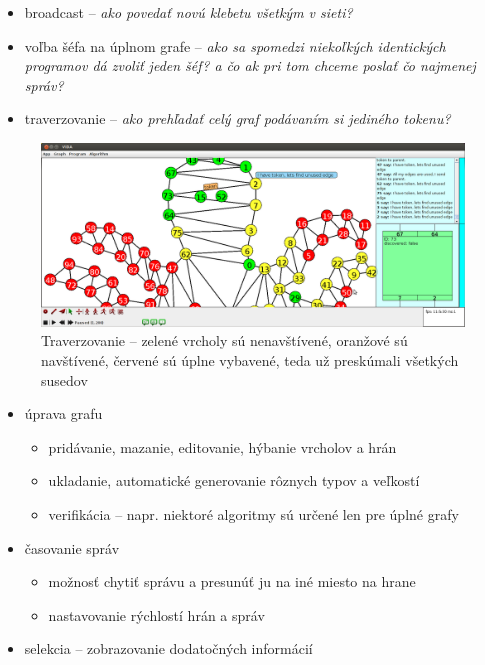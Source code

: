 
\begin{itemize}

    \item broadcast -- \textit{ako povedať novú klebetu všetkým v sieti?}
    \item voľba šéfa na úplnom grafe -- \textit{ako sa spomedzi niekoľkých identických programov
    dá zvoliť jeden šéf? a čo ak pri tom chceme poslať čo najmenej správ?}
    \item traverzovanie -- \textit{ako prehľadať celý graf podávaním si jediného tokenu?}
\end{itemize}

\begin{figure}
\vspace{-1cm}
\includegraphics[width=\columnwidth]{traverz}
\vspace{-1cm}
\caption{Traverzovanie -- zelené vrcholy sú nenavštívené, oranžové sú navštívené, červené sú úplne
vybavené, teda už preskúmali všetkých susedov}
\vspace{-1cm}
\end{figure}
    

\begin{itemize}
    \item úprava grafu
    \begin{itemize}
        \item pridávanie, mazanie, editovanie, hýbanie vrcholov a hrán
        \item ukladanie, automatické generovanie rôznych typov a veľkostí
        \item verifikácia -- napr. niektoré algoritmy sú určené len pre úplné grafy
    \end{itemize}
    \item časovanie správ
    \begin{itemize}
        \item možnosť chytiť správu a presunúť ju na iné miesto na hrane
        \item nastavovanie rýchlostí hrán a správ
    \end{itemize}
    \item selekcia -- zobrazovanie dodatočných informácií
\end{itemize}
\vspace{-0.5cm}

